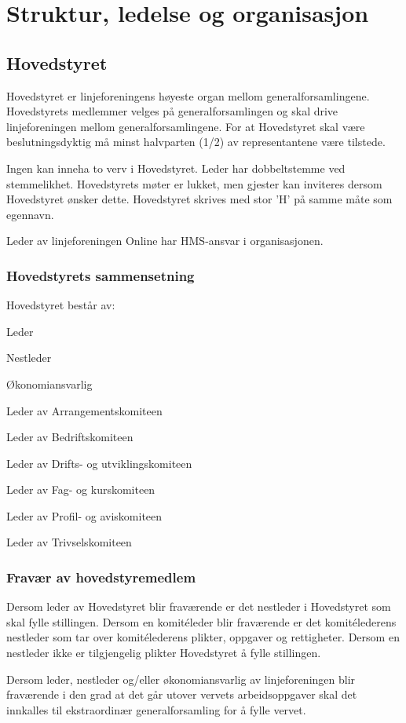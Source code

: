 \chapter{Struktur, ledelse og organisasjon}
\section{Hovedstyret}
\vspace{23pt}

Hovedstyret er linjeforeningens høyeste organ mellom generalforsamlingene. Hovedstyrets medlemmer velges på generalforsamlingen og skal drive linjeforeningen mellom generalforsamlingene. For at Hovedstyret skal være beslutningsdyktig må minst halvparten (1/2) av representantene være tilstede.\newline

Ingen kan inneha to verv i Hovedstyret. Leder har dobbeltstemme ved stemmelikhet. Hovedstyrets møter er lukket, men gjester kan inviteres dersom Hovedstyret ønsker dette. Hovedstyret skrives med stor ’H’ på samme måte som egennavn.

Leder av linjeforeningen Online har HMS-ansvar i organisasjonen.


\subsection{Hovedstyrets sammensetning}{
Hovedstyret består av:
\begin{liste}
	\item Leder
	\item Nestleder
	\item Økonomiansvarlig
	\item Leder av Arrangementskomiteen
	\item Leder av Bedriftskomiteen
	\item Leder av Drifts- og utviklingskomiteen
	\item Leder av Fag- og kurskomiteen
	\item Leder av Profil- og aviskomiteen
	\item Leder av Trivselskomiteen
\end{liste}
}


\subsection{Fravær av hovedstyremedlem}{
Dersom leder av Hovedstyret blir fraværende er det nestleder i Hovedstyret som skal fylle stillingen. Dersom en komitéleder blir fraværende er det komitélederens nestleder som tar over komitélederens plikter, oppgaver og rettigheter. Dersom en nestleder ikke er tilgjengelig plikter Hovedstyret å fylle stillingen.

Dersom leder, nestleder og/eller økonomiansvarlig av linjeforeningen blir fraværende i den grad at det går utover vervets arbeidsoppgaver skal det innkalles til ekstraordinær generalforsamling for å fylle vervet.
}
